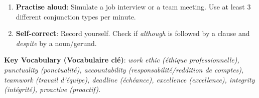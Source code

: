 \documentclass[11pt]{article}
\begin{document}
\begin{methode}
\begin{enumerate}
\begin{itemize}
              \end{itemize}
        \item \textbf{Practise aloud}: Simulate a job interview or a team meeting. Use at least 3 different conjunction types per minute.
        \item \textbf{Self-correct}: Record yourself. Check if \emph{although} is followed by a clause and \emph{despite} by a noun/gerund.
    \end{enumerate}
    \textbf{Key Vocabulary (Vocabulaire clé)}: \textit{work ethic (éthique professionnelle), punctuality (ponctualité), accountability (responsabilité/reddition de comptes), teamwork (travail d'équipe), deadline (échéance), excellence (excellence), integrity (intégrité), proactive (proactif).}
\end{methode}
\end{document}
